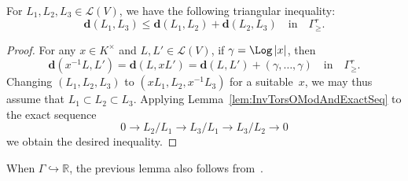 \begin{lemm}\label{lem:triangIneq}
For $L_{1},L_{2},L_{3}\in\mathcal{L}(V)$, we have the following triangular inequality:
\[
\mathbf{d}(L_{1},L_{3})\leq\mathbf{d}(L_{1},L_{2})+\mathbf{d}(L_{2},L_{3})\quad\text{in}\quad\Gamma_{\geq}^{r}.
\]
\end{lemm}

\begin{proof}
For any $x\in K^{\times}$ and $L,L'\in\mathcal{L}(V)$, if $\gamma=\Log\left|x\right|$, then
\[
\mathbf{d}(x^{-1}L,L')=\mathbf{d}(L,xL')=\mathbf{d}(L,L')+(\gamma,\dots,\gamma)\quad\text{in}\quad\Gamma_{\geq}^{r}.
\]
Changing $(L_{1},L_{2},L_{3})$ to $(xL_{1},L_{2},x^{-1}L_{3})$ for a suitable~$x$, we may thus assume that $L_{1}\subset L_{2}\subset L_{3}$. Applying Lemma~\ref{lem:InvTorsOModAndExactSeq} to the exact sequence
\[
0\rightarrow L_{2}/L_{1}\rightarrow L_{3}/L_{1}\rightarrow L_{3}/L_{2}\rightarrow0
\]
we obtain the desired inequality.
\end{proof}

\begin{rema}
When $\Gamma\hookrightarrow\mathbb{R}$, the previous lemma also follows from~\cite[5.2.8 \& 6.1]{Co14}.
\end{rema}

